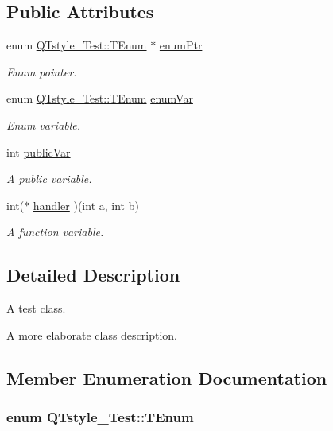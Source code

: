 \subsection*{Public Attributes}
\begin{DoxyCompactItemize}
\item 
enum \hyperlink{classQTstyle__Test_a0525f798cda415a94fedeceb806d2c49}{Q\-Tstyle\-\_\-\-Test\-::\-T\-Enum} $\ast$ \hyperlink{classQTstyle__Test_a973a4566c9a036f4eca508ba5fe80dcb}{enum\-Ptr}
\begin{DoxyCompactList}\small\item\em Enum pointer. \end{DoxyCompactList}\item 
enum \hyperlink{classQTstyle__Test_a0525f798cda415a94fedeceb806d2c49}{Q\-Tstyle\-\_\-\-Test\-::\-T\-Enum} \hyperlink{classQTstyle__Test_adb265d815b43f1f7f0de0e8b8852a5d0}{enum\-Var}
\begin{DoxyCompactList}\small\item\em Enum variable. \end{DoxyCompactList}\item 
int \hyperlink{classQTstyle__Test_aabf7b2e9ed83ea44aca4d213baae06d3}{public\-Var}
\begin{DoxyCompactList}\small\item\em A public variable. \end{DoxyCompactList}\item 
int($\ast$ \hyperlink{classQTstyle__Test_ac68d885776e89890c4732ae625c3f7fb}{handler} )(int a, int b)
\begin{DoxyCompactList}\small\item\em A function variable. \end{DoxyCompactList}\end{DoxyCompactItemize}


\subsection{Detailed Description}
A test class. 

A more elaborate class description. 

\subsection{Member Enumeration Documentation}
\hypertarget{classQTstyle__Test_a0525f798cda415a94fedeceb806d2c49}{
\subsubsection[{T\-Enum}]{\setlength{\rightskip}{0pt plus 5cm}enum {\bf Q\-Tstyle\-\_\-\-Test\-::\-T\-Enum}}}\label{classQTstyle__Test_a0525f798cda415a94fedeceb806d2c49}


